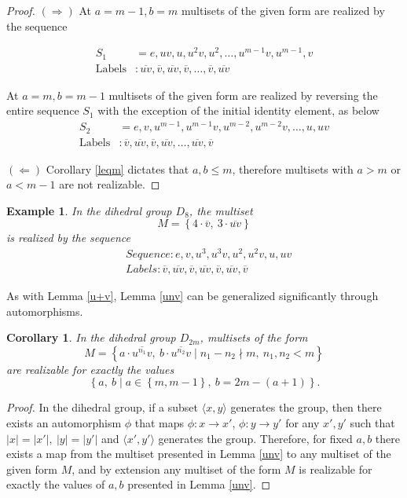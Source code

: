 \documentclass[12pt]{article}
\newtheorem{cor}[thm]{Corollary}
\newtheorem{exa}[thm]{Example}
\newcommand{\ba}{\[\begin{aligned}}
\newcommand{\ea}{\end{aligned}\]}
\newcommand{\setof}[1]{\left\{#1\right\}}
\newcommand{\setdef}[2]{\left\{#1\mid#2\right\}}
\newcommand{\gen}[1]{\langle#1\rangle} %
\newcommand{\ol}[1]{\overline{#1}} %
\begin{document}
\begin{proof}
  $(\Rightarrow)$
  At $a = m - 1, b = m$ multisets of the given form are realized by the sequence
 
  \ba
  S_1 &= e, uv, u, u^2v, u^2, \dots , u^{m-1}v, u^{m-1}, v\\
  \text{Labels} &: \ol{uv}, \ol{v}, \ol{uv}, \ol{v}, \dots, \ol{v}, \ol{uv}
  \ea
 
  At $a = m, b = m - 1$ multisets of the given form are realized by reversing
  the entire sequence $S_1$ with the exception of the initial identity element, as below
  \ba
  S_2 &= e, v, u^{m-1}, u^{m-1}v, u^{m-2}, u^{m-2}v, \dots , u, uv\\
  \text{Labels} &: \ol{v}, \ol{uv}, \ol{v}, \ol{uv}, \dots, \ol{uv}, \ol{v}
  \ea

  $(\Leftarrow)$
  Corollary \ref{leqm} dictates that $a,b \leq m$, therefore multisets with $a > m$ or
  $a < m - 1$ are not realizable.
\end{proof}

\begin{exa}
  In the dihedral group $D_{8}$, the multiset
  $$M = \setof{4 \cdot \ol{v},\ 3 \cdot \ol{uv}}$$
  is realized by the sequence
  \ba
  &Sequence : e, v, u^3, u^3v, u^2, u^2v, u, uv\\
  &Labels : \ol{v}, \ol{uv}, \ol{v}, \ol{uv}, \ol{v}, \ol{uv}, \ol{v}
  \ea
\end{exa}

As with Lemma \ref{u+v}, Lemma \ref{unv} can be generalized significantly through automorphisms.

\begin{cor} \label{uvv}
In the dihedral group $D_{2m}$, multisets of the form
$$M = \setdef{a \cdot \ol{u^{n_1}v},\ b \cdot \ol{u^{n_2}v}}{n_1 - n_2 \nmid m,\ n_1,n_2 < m}$$
are realizable for exactly the values
$$\setdef{a,\ b}{a \in \setof{m, m-1},\ b = 2m - (a + 1)}.$$
\end{cor}

\begin{proof}
  In the dihedral group, if a subset $\gen{x, y}$ generates the group, then there
  exists an automorphism $\phi$ that maps $\phi : x \to x'$, $\phi : y \to y'$
  for any $x', y'$ such that $|x| = |x'|,\ |y| = |y'|$ and $\gen{x', y'}$ generates
  the group. Therefore, for fixed $a,b$ there exists a map from the multiset presented in Lemma \ref{unv}
  to any multiset of the given form $M$, and by extension any multiset of the form $M$ is realizable for
  exactly the values of $a, b$ presented in Lemma \ref{unv}.
\end{proof}
\end{document}
